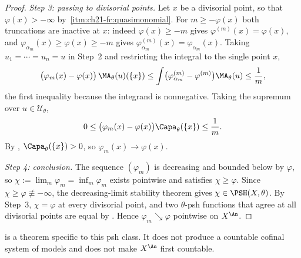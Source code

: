 \begin{proof}
\emph{Step 3: passing to divisorial points.}  Let $x$ be a divisorial
point, so that $\varphi(x)>-\infty$ by
\,\cref{itm:ch21-fc:quasimonomial}.  For
$m\geq-\varphi(x)$ both truncations are inactive at $x$: indeed
$\varphi(x)\geq-m$ gives $\varphi^{(m)}(x)=\varphi(x)$, and
$\varphi_{\alpha_m}(x)\geq\varphi(x)\geq-m$ gives
$\varphi^{(m)}_{\alpha_m}(x)=\varphi_{\alpha_m}(x)$.  Taking
$u_1=\cdots=u_n=u$ in Step~2 and restricting the integral to the single
point $x$,
\[
 \bigl(\varphi_{m}(x)-\varphi(x)\bigr)\,\MA_\theta(u)(\{x\})
 \leq\int\bigl(\varphi^{(m)}_{\alpha_m}-\varphi^{(m)}\bigr)\MA_\theta(u)
 \leq\frac1m ,
\]
the first inequality because the integrand is nonnegative.  Taking the
supremum over $u\in\mathcal U_\theta$,
\[
 0\leq\bigl(\varphi_{m}(x)-\varphi(x)\bigr)\Capa_\theta(\{x\})
 \leq\frac1m .
\]
By , $\Capa_\theta(\{x\})>0$, so
$\varphi_m(x)\to\varphi(x)$.

\emph{Step 4: conclusion.}  The sequence $(\varphi_m)$ is decreasing and
bounded below by $\varphi$, so $\chi:=\lim_m\varphi_m=\inf_m\varphi_m$
exists pointwise and satisfies $\chi\geq\varphi$.  Since
$\chi\geq\varphi\not\equiv-\infty$, the decreasing-limit stability theorem
 gives $\chi\in\PSH(X,\theta)$.  By
Step~3, $\chi=\varphi$ at every divisorial point, and two $\theta$-psh
functions that agree at all divisorial points are equal by
.  Hence $\varphi_m\searrow\varphi$
pointwise on $X^{\An}$.
\end{proof}

\begin{remark}
\label{rem:ch25-sequential-specific}
 is a theorem specific to
this psh class. It does not produce a countable cofinal system of models and
does not make $X^{\An}$ first countable.
\end{remark}

